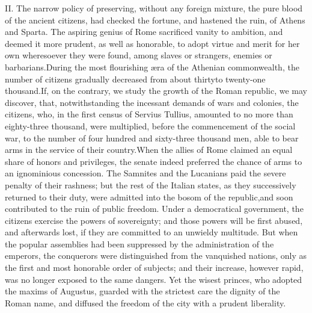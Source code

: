 II. The narrow policy of preserving, without any foreign mixture,
the pure blood of the ancient citizens, had checked the fortune,
and hastened the ruin, of Athens and Sparta. The aspiring genius
of Rome sacrificed vanity to ambition, and deemed it more
prudent, as well as honorable, to adopt virtue and merit for her
own wheresoever they were found, among slaves or strangers,
enemies or barbarians.\footnotemark[20] During the most flourishing æra of the
Athenian commonwealth, the number of citizens gradually decreased
from about thirty\footnotemark[21] to twenty-one thousand.\footnotemark[22] If, on the
contrary, we study the growth of the Roman republic, we may
discover, that, notwithstanding the incessant demands of wars and
colonies, the citizens, who, in the first census of Servius
Tullius, amounted to no more than eighty-three thousand, were
multiplied, before the commencement of the social war, to the
number of four hundred and sixty-three thousand men, able to bear
arms in the service of their country.\footnotemark[23] When the allies of Rome
claimed an equal share of honors and privileges, the senate
indeed preferred the chance of arms to an ignominious concession.
The Samnites and the Lucanians paid the severe penalty of their
rashness; but the rest of the Italian states, as they
successively returned to their duty, were admitted into the bosom
of the republic,\footnotemark[24] and soon contributed to the ruin of public
freedom. Under a democratical government, the citizens exercise
the powers of sovereignty; and those powers will be first abused,
and afterwards lost, if they are committed to an unwieldy
multitude. But when the popular assemblies had been suppressed by
the administration of the emperors, the conquerors were
distinguished from the vanquished nations, only as the first and
most honorable order of subjects; and their increase, however
rapid, was no longer exposed to the same dangers. Yet the wisest
princes, who adopted the maxims of Augustus, guarded with the
strictest care the dignity of the Roman name, and diffused the
freedom of the city with a prudent liberality.\footnotemark[25]


